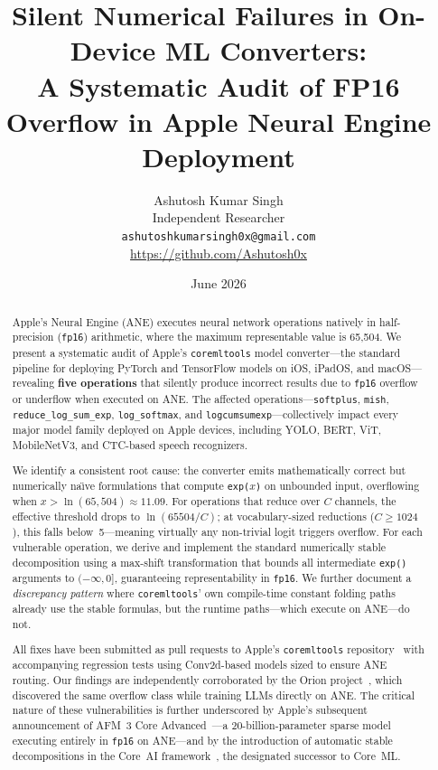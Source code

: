 \documentclass[10pt,twocolumn]{article}
\title{%
  \textbf{Silent Numerical Failures in On-Device ML Converters:\\
  A Systematic Audit of FP16 Overflow in Apple Neural Engine Deployment}%
}
\author{
  Ashutosh Kumar Singh \\
  Independent Researcher \\
  \texttt{ashutoshkumarsingh0x@gmail.com} \\
  \url{https://github.com/Ashutosh0x}
}
\date{June 2026}
\newcommand{\fp}{\texttt{fp16}}
\newcommand{\ane}{ANE}
\newcommand{\coreml}{Core~ML}
\newcommand{\coremltools}{\texttt{coremltools}}
\newcommand{\expop}{\texttt{exp()}}
\begin{document}
\maketitle

\begin{abstract}
Apple's Neural Engine (\ane{}) executes neural network operations natively in
half-precision (\fp{}) arithmetic, where the maximum representable value is
65{,}504.  We present a systematic audit of Apple's \coremltools{} model
converter---the standard pipeline for deploying PyTorch and TensorFlow models
on iOS, iPadOS, and macOS---revealing \textbf{five operations} that silently
produce incorrect results due to \fp{} overflow or underflow when executed on
\ane{}.  The affected operations---\texttt{softplus}, \texttt{mish},
\texttt{reduce\_log\_sum\_exp}, \texttt{log\_softmax}, and
\texttt{logcumsumexp}---collectively impact every major model family deployed on
Apple devices, including YOLO, BERT, ViT, MobileNetV3, and CTC-based speech
recognizers.

We identify a consistent root cause: the converter emits mathematically correct
but numerically na\"{\i}ve formulations that compute \texttt{exp($x$)} on
unbounded input, overflowing when $x > \ln(65{,}504) \approx 11.09$.  For
operations that reduce over $C$ channels, the effective threshold drops to
$\ln(65504/C)$; at vocabulary-sized reductions ($C {\geq} 1024$), this falls
below~5---meaning virtually any non-trivial logit triggers overflow.  For each
vulnerable operation, we derive and implement the standard numerically stable
decomposition using a max-shift transformation that bounds all intermediate
\expop{} arguments to $(-\infty, 0]$, guaranteeing representability in \fp{}.
We further document a \emph{discrepancy pattern} where \coremltools{}' own
compile-time constant folding paths already use the stable formulas, but the
runtime paths---which execute on \ane{}---do not.

All fixes have been submitted as pull requests to Apple's \coremltools{}
repository~\citep{pr2725,pr2726,pr2727} with accompanying regression tests
using Conv2d-based models sized to ensure \ane{} routing.
Our findings are independently corroborated by the Orion
project~\citep{kumaresan2026orion}, which discovered the same overflow class
while training LLMs directly on \ane{}.  The critical nature of these
vulnerabilities is further underscored by Apple's subsequent announcement of
AFM~3 Core Advanced~\citep{apple2026afm3}---a 20-billion-parameter sparse
model executing entirely in \fp{} on \ane{}---and by the introduction of
automatic stable decompositions in the Core~AI
framework~\citep{apple2026coreai}, the designated successor to \coreml{}.

\end{abstract}
\end{document}
